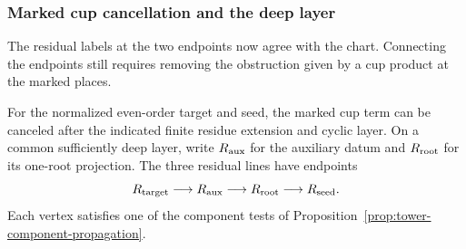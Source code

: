 \subsubsection{Marked cup cancellation and the deep layer}
\label{par:marked-cup}

The residual labels at the two endpoints now agree with the chart. Connecting the endpoints still requires removing the obstruction given by a cup product at the marked places.

\begin{proposition}\label{prop:count-two-residual-links}
For the normalized even-order target and seed, the marked
cup term can be canceled after the indicated finite residue
extension and cyclic layer. On a common sufficiently deep layer, write \(R_{\rm aux}\) for the auxiliary datum and \(R_{\rm root}\) for its one-root projection. The three residual lines have endpoints 
\[
 R_{\rm target}\longrightarrow R_{\rm aux}\longrightarrow R_{\rm root}\longrightarrow R_{\rm seed}.
\]
 Each vertex satisfies one of the component tests of
Proposition~\ref{prop:tower-component-propagation}.
\end{proposition}

